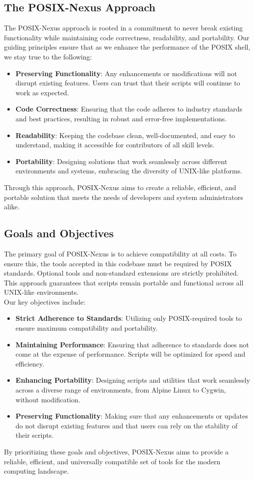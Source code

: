 \subsection{The POSIX-Nexus Approach}

The POSIX-Nexus approach is rooted in a commitment to never break existing functionality while maintaining code correctness, readability, and portability. Our guiding principles ensure that as we enhance the performance of the POSIX shell, we stay true to the following:
\\
\begin{itemize} \item \textbf{Preserving Functionality}: Any enhancements or modifications will not disrupt existing features. Users can trust that their scripts will continue to work as expected. \item \textbf{Code Correctness}: Ensuring that the code adheres to industry standards and best practices, resulting in robust and error-free implementations. \item \textbf{Readability}: Keeping the codebase clean, well-documented, and easy to understand, making it accessible for contributors of all skill levels. \item \textbf{Portability}: Designing solutions that work seamlessly across different environments and systems, embracing the diversity of UNIX-like platforms. \end{itemize}

Through this approach, POSIX-Nexus aims to create a reliable, efficient, and portable solution that meets the needs of developers and system administrators alike.

\newpage

\subsection{Goals and Objectives}

The primary goal of POSIX-Nexus is to achieve compatibility at all costs. To ensure this, the tools accepted in this codebase must be required by POSIX standards. Optional tools and non-standard extensions are strictly prohibited. This approach guarantees that scripts remain portable and functional across all UNIX-like environments.
\\
Our key objectives include: \begin{itemize} \item \textbf{Strict Adherence to Standards}: Utilizing only POSIX-required tools to ensure maximum compatibility and portability. \item \textbf{Maintaining Performance}: Ensuring that adherence to standards does not come at the expense of performance. Scripts will be optimized for speed and efficiency. \item \textbf{Enhancing Portability}: Designing scripts and utilities that work seamlessly across a diverse range of environments, from Alpine Linux to Cygwin, without modification. \item \textbf{Preserving Functionality}: Making sure that any enhancements or updates do not disrupt existing features and that users can rely on the stability of their scripts. \end{itemize}

By prioritizing these goals and objectives, POSIX-Nexus aims to provide a reliable, efficient, and universally compatible set of tools for the modern computing landscape.
